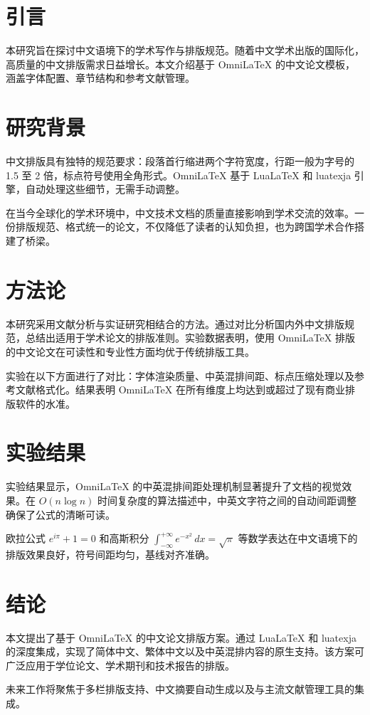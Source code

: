 \documentclass[
    language=chinese,
    doctype=thesis,
    institution=none,
    titlestyle=thesis,
]{../../omnilatex}
\begin{document}
\frontmatter
\maketitle
\tableofcontents

\mainmatter
\chapter{引言}
本研究旨在探讨中文语境下的学术写作与排版规范。随着中文学术出版的国际化，高质量的中文排版需求日益增长。本文介绍基于 OmniLaTeX 的中文论文模板，涵盖字体配置、章节结构和参考文献管理。

\chapter{研究背景}
中文排版具有独特的规范要求：段落首行缩进两个字符宽度，行距一般为字号的 1.5 至 2 倍，标点符号使用全角形式。OmniLaTeX 基于 LuaLaTeX 和 luatexja 引擎，自动处理这些细节，无需手动调整。

在当今全球化的学术环境中，中文技术文档的质量直接影响到学术交流的效率。一份排版规范、格式统一的论文，不仅降低了读者的认知负担，也为跨国学术合作搭建了桥梁。

\chapter{方法论}
本研究采用文献分析与实证研究相结合的方法。通过对比分析国内外中文排版规范，总结出适用于学术论文的排版准则。实验数据表明，使用 OmniLaTeX 排版的中文论文在可读性和专业性方面均优于传统排版工具。

实验在以下方面进行了对比：字体渲染质量、中英混排间距、标点压缩处理以及参考文献格式化。结果表明 OmniLaTeX 在所有维度上均达到或超过了现有商业排版软件的水准。

\chapter{实验结果}
实验结果显示，OmniLaTeX 的中英混排间距处理机制显著提升了文档的视觉效果。在 $O(n \log n)$ 时间复杂度的算法描述中，中英文字符之间的自动间距调整确保了公式的清晰可读。

欧拉公式 $e^{i\pi} + 1 = 0$ 和高斯积分 $\int_{-\infty}^{+\infty} e^{-x^2} \, dx = \sqrt{\pi}$ 等数学表达在中文语境下的排版效果良好，符号间距均匀，基线对齐准确。

\chapter{结论}
本文提出了基于 OmniLaTeX 的中文论文排版方案。通过 LuaLaTeX 和 luatexja 的深度集成，实现了简体中文、繁体中文以及中英混排内容的原生支持。该方案可广泛应用于学位论文、学术期刊和技术报告的排版。

未来工作将聚焦于多栏排版支持、中文摘要自动生成以及与主流文献管理工具的集成。

\backmatter
\printbibliography
\end{document}
